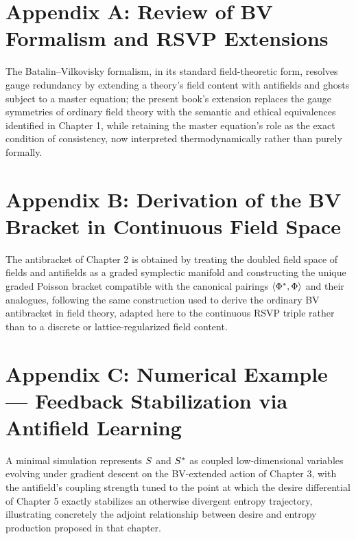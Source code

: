 \chapter*{Appendix A: Review of BV Formalism and RSVP Extensions}

The Batalin--Vilkovisky formalism, in its standard field-theoretic form, resolves gauge redundancy by extending a theory's field content with antifields and ghosts subject to a master equation; the present book's extension replaces the gauge symmetries of ordinary field theory with the semantic and ethical equivalences identified in Chapter 1, while retaining the master equation's role as the exact condition of consistency, now interpreted thermodynamically rather than purely formally.

\chapter*{Appendix B: Derivation of the BV Bracket in Continuous Field Space}

The antibracket of Chapter 2 is obtained by treating the doubled field space of fields and antifields as a graded symplectic manifold and constructing the unique graded Poisson bracket compatible with the canonical pairings $\langle \Phi^{*}, \Phi \rangle$ and their analogues, following the same construction used to derive the ordinary BV antibracket in field theory, adapted here to the continuous RSVP triple rather than to a discrete or lattice-regularized field content.

\chapter*{Appendix C: Numerical Example --- Feedback Stabilization via Antifield Learning}

A minimal simulation represents $S$ and $S^{*}$ as coupled low-dimensional variables evolving under gradient descent on the BV-extended action of Chapter 3, with the antifield's coupling strength tuned to the point at which the desire differential of Chapter 5 exactly stabilizes an otherwise divergent entropy trajectory, illustrating concretely the adjoint relationship between desire and entropy production proposed in that chapter.

